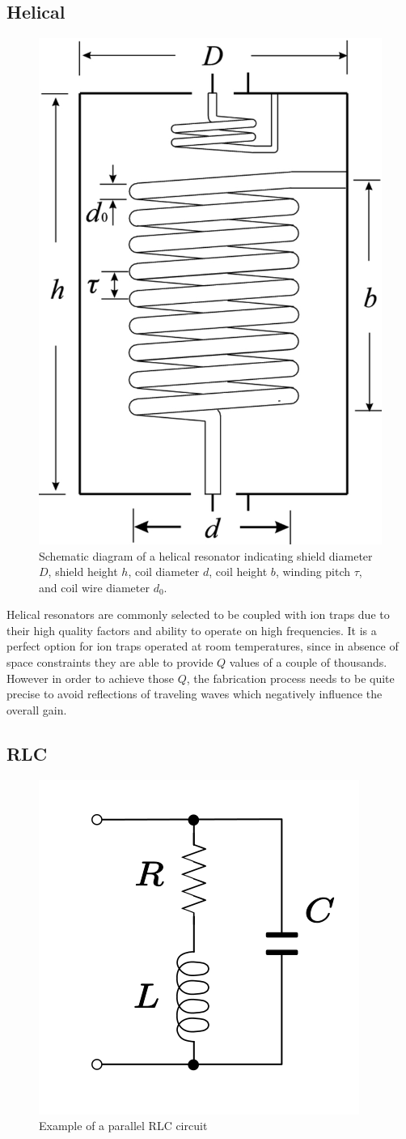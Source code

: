 \subsection{Helical}
\begin{figure}[h]
	\centering
	\includegraphics[width=.6\textwidth]{images/helical}
	\caption{Schematic diagram of a helical resonator indicating shield diameter $D$, shield height $h$, coil diameter $d$, coil height $b$, winding pitch $\tau$, and coil wire diameter $d_0$. \cite{Deng2014}}
	\label{fig:helical_example}
\end{figure}

Helical resonators are commonly selected to be coupled with ion traps due to their high quality factors and ability to operate on high frequencies. It is a perfect option for ion traps operated at room temperatures, since in absence of space constraints they are able to provide $Q$ values of a couple of thousands. However in order to achieve those $Q$, the fabrication process needs to be quite precise to avoid reflections of traveling waves which negatively influence the overall gain.
\subsection{RLC}
\begin{figure}[h]
	\centering
	\includegraphics[width=.5\textwidth]{images/RLC}
	\caption{Example of a parallel RLC circuit}
\end{figure}

